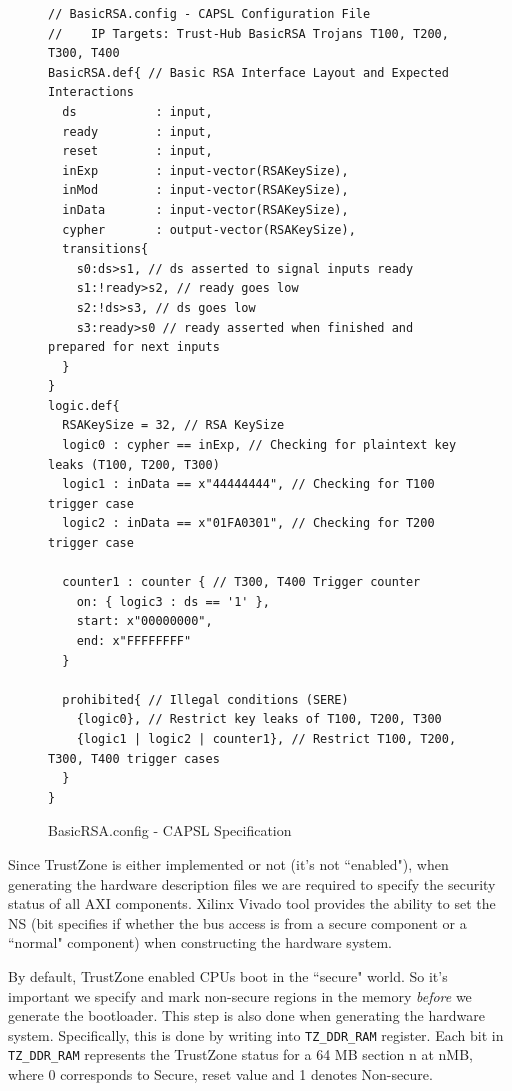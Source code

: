 \documentclass[sigconf]{acmart}
\theoremstyle{plain}
\theoremstyle{remark}
\begin{document}
\begin{figure} [t]
\begin{lstlisting}
// BasicRSA.config - CAPSL Configuration File
//    IP Targets: Trust-Hub BasicRSA Trojans T100, T200, T300, T400
BasicRSA.def{ // Basic RSA Interface Layout and Expected Interactions
  ds           : input,
  ready        : input,
  reset        : input,
  inExp        : input-vector(RSAKeySize),
  inMod        : input-vector(RSAKeySize),
  inData       : input-vector(RSAKeySize),
  cypher       : output-vector(RSAKeySize),
  transitions{
    s0:ds>s1, // ds asserted to signal inputs ready
    s1:!ready>s2, // ready goes low
    s2:!ds>s3, // ds goes low
    s3:ready>s0 // ready asserted when finished and prepared for next inputs
  }
}
logic.def{
  RSAKeySize = 32, // RSA KeySize
  logic0 : cypher == inExp, // Checking for plaintext key leaks (T100, T200, T300)
  logic1 : inData == x"44444444", // Checking for T100 trigger case
  logic2 : inData == x"01FA0301", // Checking for T200 trigger case

  counter1 : counter { // T300, T400 Trigger counter
    on: { logic3 : ds == '1' },
    start: x"00000000",
    end: x"FFFFFFFF"
  }

  prohibited{ // Illegal conditions (SERE)
    {logic0}, // Restrict key leaks of T100, T200, T300
    {logic1 | logic2 | counter1}, // Restrict T100, T200, T300, T400 trigger cases
  }
}
\end{lstlisting}
\vspace*{-0.2cm}
\caption{BasicRSA.config - CAPSL Specification}
\label{fig:BasicRSASpec}
\vspace*{-0.3cm}
\end{figure}


Since TrustZone is either implemented or not (it's not ``enabled"), when generating the  hardware description files we are required to specify the security status of all AXI components. Xilinx Vivado tool provides the ability to set the NS (bit specifies if whether the bus access is from a secure component or a ``normal" component) when constructing the hardware system.

By default, TrustZone enabled CPUs boot in the ``secure" world. So it's important we specify and mark non-secure regions in the memory \textit{before} we generate the bootloader. This step is also done when generating the hardware system. Specifically, this is done by writing into \texttt{TZ\_DDR\_RAM} register. Each bit in \texttt{TZ\_DDR\_RAM} represents the TrustZone status for a 64 MB section n at nMB, where 0 corresponds to Secure, reset value and 1 denotes Non-secure.
\end{document}
